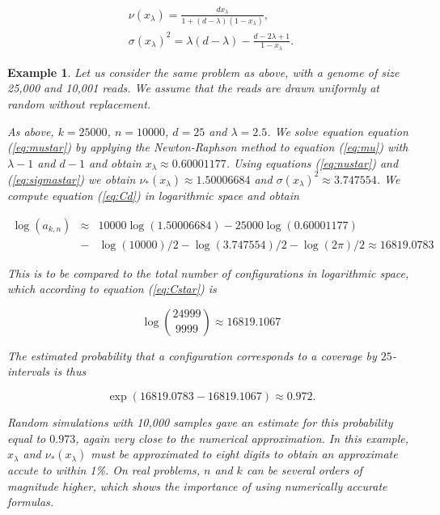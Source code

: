 \documentclass{article}
\newtheorem{example}{Example}
\begin{document}
\begin{gather}
\label{eq:nu} %
\nu(x_\lambda) = \frac{dx_\lambda}{1+(d-\lambda)(1-x_\lambda)}, \\
\label{eq:sigma} %
\sigma(x_\lambda)^2 = \lambda(d-\lambda) -
  \frac{d-2\lambda+1}{1-x_\lambda}.
\end{gather}


\begin{example}

Let us consider the same problem as above, with a genome of size 25,000
and 10,001 reads. We assume that the reads are drawn uniformly at random
without replacement.

As above, $k=25000$, $n=10000$, $d=25$ and $\lambda = 2.5$. We solve
equation equation (\ref{eq:mustar}) by applying the Newton-Raphson method
to equation (\ref{eq:mu}) with $\lambda-1$ and $d-1$ and obtain
$x_\lambda \approx 0.60001177$. Using equations (\ref{eq:nustar}) and
(\ref{eq:sigmastar}) we obtain $\nu_*(x_\lambda) \approx 1.50006684$ and
$\sigma(x_\lambda)^2 \approx 3.747554$. We compute equation
(\ref{eq:Cd}) in logarithmic space and obtain

\begin{eqnarray*}
\log(a_{k,n}) &\approx& 10000\log(1.50006684) - 25000\log(0.60001177) \\
&-& \log(10000)/2 - \log(3.747554)/2 - \log(2\pi)/2
\approx 16819.0783
\end{eqnarray*}

This is to be compared to the total number of configurations in
logarithmic space, which according to equation (\ref{eq:Cstar}) is

\begin{equation*}
\log { 24999 \choose 9999 } \approx 16819.1067
\end{equation*}

The estimated probability that a configuration corresponds to a coverage
by $25$-intervals is
thus

\begin{equation*}
\exp(16819.0783-16819.1067) \approx 0.972.
\end{equation*}

Random simulations with 10,000 samples gave an estimate for this
probability equal to $0.973$, again very close to the numerical
approximation. In this example, $x_\lambda$ and $\nu_*(x_\lambda)$ must be
approximated to eight digits to obtain an approximate accute to within
1\%. On real problems, $n$ and $k$ can be several orders of magnitude
higher, which shows the importance of using numerically accurate formulas.

\end{example}
\end{document}
